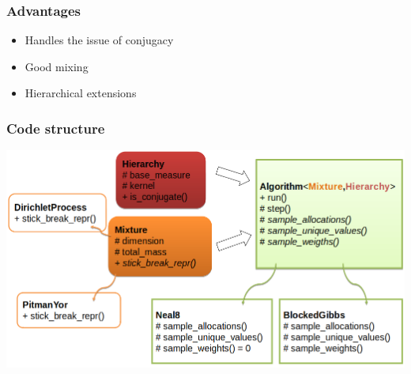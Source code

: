 \begin{frame}
	\frametitle{Advantages}
		\begin{itemize}
		     \item Handles the issue of conjugacy
		    \item Good mixing %
		    \item Hierarchical extensions
	\end{itemize}

\begin{frame}
	\frametitle{Code structure}
	\includegraphics{etc/code_map.png}
\end{frame}

\end{frame}

